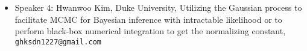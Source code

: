 \begin{session}
\begin{itemize}
 \item Speaker 4: Hwanwoo Kim, Duke University, Utilizing the Gaussian process to facilitate MCMC for Bayesian inference with intractable likelihood or to perform black-box numerical integration to get the normalizing constant, \texttt{ghksdn1227@gmail.com}
 \end{itemize}
 \begin{comment}
 If you would like to include references, please do so by creating a simple list numbered by [1], [2], [3], \ldots. See example below.
 Please do not use the \texttt{bibliography} environment or \texttt{bibtex} files.
 \begin{enumerate}
 \item[{[1]}] Niederreiter, Harald (1992). {\it Random number generation and quasi-Monte Carlo methods}. Society for Industrial and Applied Mathematics (SIAM).
 \item[{[2]}] Roberts, Gareth O, \& Rosenthal, Jeffrey S. (2002).  Optimal scaling for various Metropolis-Hastings algorithms, \textbf{16}(4), 351--367.
 \end{enumerate}
 Equations may be used if they are referenced. Please note that the equation numbers may be different (but will be cross-referenced correctly) in the final program book.
 \end{comment}
\end{session}



\clearpage

